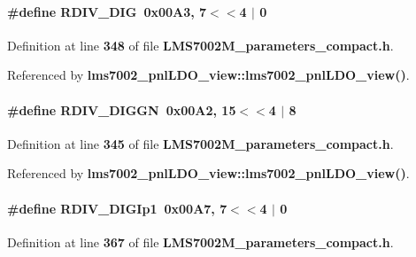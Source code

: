 \paragraph[{R\+D\+I\+V\+\_\+\+D\+IG}]{\setlength{\rightskip}{0pt plus 5cm}\#define R\+D\+I\+V\+\_\+\+D\+IG~0x00\+A3, 7$<$$<$4 $\vert$  0}\label{LMS7002M__parameters__compact_8h_a8ccffec596c8689282218b58f505d020}


Definition at line {\bf 348} of file {\bf L\+M\+S7002\+M\+\_\+parameters\+\_\+compact.\+h}.



Referenced by {\bf lms7002\+\_\+pnl\+L\+D\+O\+\_\+view\+::lms7002\+\_\+pnl\+L\+D\+O\+\_\+view()}.

\paragraph[{R\+D\+I\+V\+\_\+\+D\+I\+G\+GN}]{\setlength{\rightskip}{0pt plus 5cm}\#define R\+D\+I\+V\+\_\+\+D\+I\+G\+GN~0x00\+A2, 15$<$$<$4 $\vert$  8}\label{LMS7002M__parameters__compact_8h_aae08faccd245f66f185efd99fc74d557}


Definition at line {\bf 345} of file {\bf L\+M\+S7002\+M\+\_\+parameters\+\_\+compact.\+h}.



Referenced by {\bf lms7002\+\_\+pnl\+L\+D\+O\+\_\+view\+::lms7002\+\_\+pnl\+L\+D\+O\+\_\+view()}.

\paragraph[{R\+D\+I\+V\+\_\+\+D\+I\+G\+Ip1}]{\setlength{\rightskip}{0pt plus 5cm}\#define R\+D\+I\+V\+\_\+\+D\+I\+G\+Ip1~0x00\+A7, 7$<$$<$4 $\vert$  0}\label{LMS7002M__parameters__compact_8h_ad2889a9b4236486752f70d6aa119509d}


Definition at line {\bf 367} of file {\bf L\+M\+S7002\+M\+\_\+parameters\+\_\+compact.\+h}.



